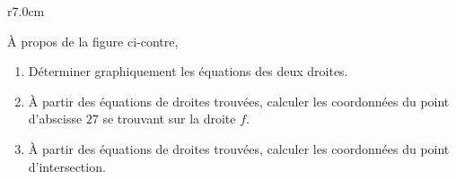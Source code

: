 
\begin{exercice}\label{exosmath-0229}

\begin{wrapfigure}{r}{7.0cm}
            \vspace{-3cm}        %
                \centering
                    
                \end{wrapfigure}

        À propos de la figure ci-contre, 
        \begin{enumerate}
            \item
                Déterminer graphiquement les équations des deux droites.
            \item
                À partir des équations de droites trouvées, calculer les coordonnées du point d'abscisse \( 27\) se trouvant sur la droite \( f\).
            \item
                À partir des équations de droites trouvées, calculer les coordonnées du point d'intersection.
        \end{enumerate}

\end{exercice}
